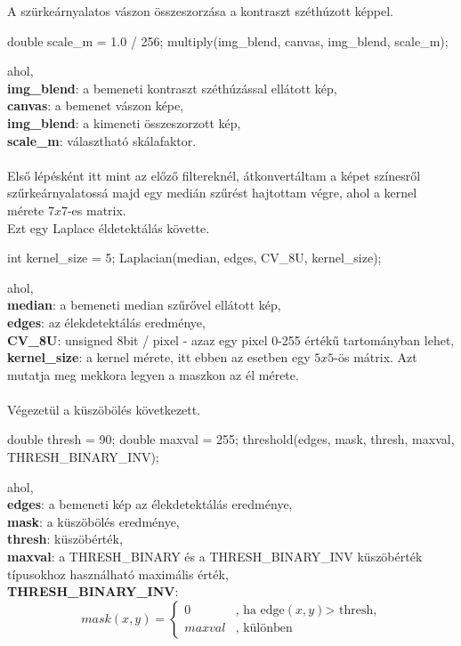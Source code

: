A szürkeárnyalatos vászon összeszorzása a kontraszt széthúzott képpel.
\begin{cpp}
double scale_m = 1.0 / 256;
multiply(img_blend, canvas, img_blend, scale_m);
\end{cpp}
ahol, \\
\indent \textbf{img\_blend}: a bemeneti kontraszt széthúzással ellátott kép,\\
\indent \textbf{canvas}: a bemenet vászon képe,\\
\indent \textbf{img\_blend}: a kimeneti összeszorzott kép,\\
\indent \textbf{scale\_m}: választható skálafaktor.\\\\
Első lépésként itt mint az előző filtereknél, átkonvertáltam a képet színesről szűrkeárnyalatossá majd egy medián szűrést hajtottam végre, ahol a kernel mérete $7 x 7$-es matrix.\\
Ezt egy Laplace éldetektálás követte.
\begin{cpp}
int kernel_size = 5;  
Laplacian(median, edges, CV_8U, kernel_size);
\end{cpp}
 ahol, \\
\indent \textbf{median}: a bemeneti median szűrővel ellátott kép,\\
\indent \textbf{edges}: az élekdetektálás eredménye,\\
\indent \textbf{CV\_8U}: unsigned 8bit / pixel - azaz egy pixel 0-255 értékű tartományban lehet,\\
\indent \textbf{kernel\_size}: a kernel mérete, itt ebben az esetben egy $5 x 5$-ös mátrix. Azt mutatja meg mekkora legyen a maszkon az él mérete.\\ \\
Végezetül a küszöbölés következett.
\begin{cpp}
double thresh = 90;
double maxval = 255;
threshold(edges, mask, thresh, maxval, THRESH_BINARY_INV);
\end{cpp}
 ahol, \\
\indent \textbf{edges}: a bemeneti kép az élekdetektálás eredménye,\\
\indent \textbf{mask}: a küszöbölés eredménye,\\
\indent \textbf{thresh}: küszöbérték,\\
\indent \textbf{maxval}: a THRESH\_BINARY és a THRESH\_BINARY\_INV küszöbérték típusokhoz használható maximális érték,\\
\indent \textbf{THRESH\_BINARY\_INV}:
 \[
 mask(x,y)=\left\{
 \begin{array}{ll}
 0 & \mbox{, ha edge$(x,y)$> thresh,}\\
 maxval & \mbox{, különben}
 \end{array}
 \right.
\]
